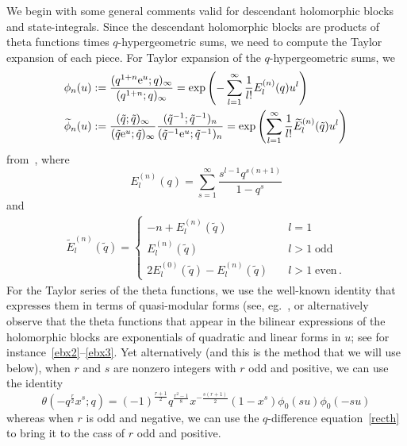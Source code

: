 \documentclass[12pt,reqno]{amsart}
\theoremstyle{definition}
\def\tq{\tilde{q}}
\def\th{\theta}
\def\wt{\widetilde}
\def\re{{\rm e}}
\begin{document}
We begin with some general comments valid for descendant holomorphic
blocks and state-integrals.  Since the descendant holomorphic blocks
are products of theta functions times $q$-hypergeometric sums, we need
to compute the Taylor expansion of each piece. For Taylor expansion of
the $q$-hypergeometric sums, we
\begin{subequations}
\begin{align}
  &\phi_n(u):=\frac{(q^{1+n}\re^u;q)_\infty}{(q^{1+n};q)_\infty}
    =\exp\left(-\sum_{l=1}^\infty \frac{1}{l!}E_l^{(n)}(q) u^l \right)
    \label{eq:phin}\\
  &\wt{\phi}_n(u):=\frac{(\tq;\tq)_\infty}{(\tq\re^u;\tq)_\infty}
    \frac{(\tq^{-1};\tq^{-1})_n}{(\tq^{-1}\re^u;\tq^{-1})_n}
    =\exp\left(\sum_{l=1}^\infty
    \frac{1}{l!}\wt{E}_l^{(n)}(\tq) u^l\right)
    \label{eq:tphin}
  \end{align}
\end{subequations}
from~\cite[Prop.2.2]{GK:qseries}, where
\begin{equation}
\label{En}
E_l^{(n)}(q)=\sum_{s=1}^\infty \frac{s^{l-1} q^{s(n+1)}}{1-q^s} 
\end{equation}
and
\begin{align}
  \wt{E}_l^{(n)}(\tq) =
  \begin{cases}
    -n+E_l^{(n)}(\tq) \quad &l=1\\
    E_l^{(n)}(\tq)\quad &l>1\;\text{odd}\\
    2E_l^{(0)}(\tq) - E_l^{(n)}(\tq)\quad &l>1\;\text{even} \,.
  \end{cases} 
\end{align}
For the Taylor series of the theta functions, we use the well-known
identity that expresses them in terms of quasi-modular forms (see,
eg.~\cite[Sec.8, Eqn(76)]{Za:quasimod}, or alternatively observe that
the theta functions that appear in the bilinear expressions of the
holomorphic blocks are exponentials of quadratic and linear forms in
$u$; see for instance~\eqref{ebx2}--\eqref{ebx3}.  Yet alternatively
(and this is the method that we will use below), when $r$ and $s$ are
nonzero integers with $r$ odd and positive, we can use the identity
\begin{equation}
  \label{thrs}
  \th(-q^{\frac{r}{2}} x^s;q)
  =(-1)^{\frac{r+1}{2}}q^{\frac{r^2-1}{8}}x^{-\frac{s(r+1)}{2}}(1-x^s)
  \phi_0(su)\phi_0(-su)  %
\end{equation}
whereas when $r$ is odd and negative, we can use the $q$-difference
equation~\eqref{recth} to bring it to the cass of $r$ odd and positive.
\end{document}
